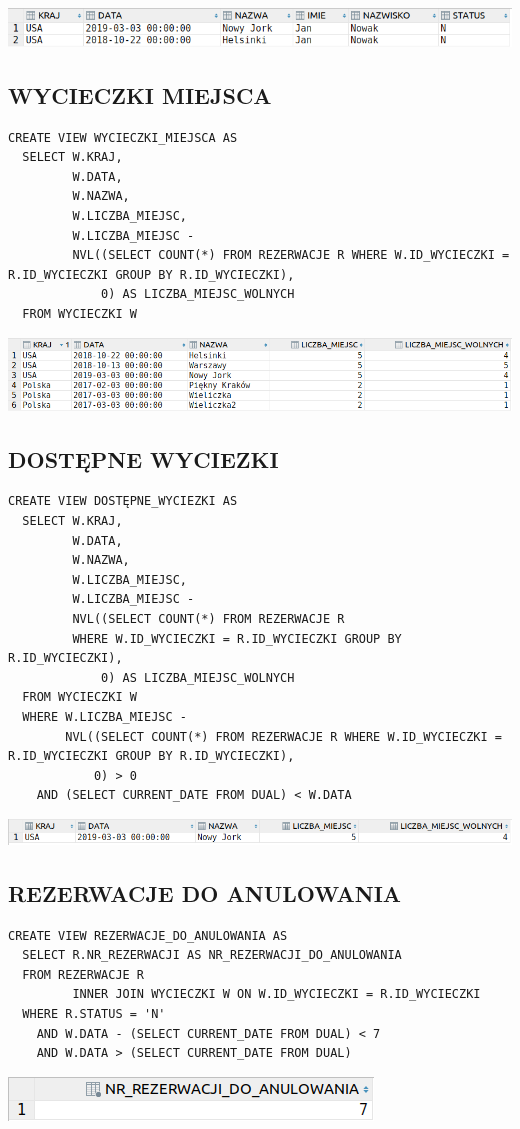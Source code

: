 \includegraphics[width=\linewidth]{./images/wycieczki_przyszle.png}

\subsection{WYCIECZKI MIEJSCA}
\begin{verbatim}
CREATE VIEW WYCIECZKI_MIEJSCA AS
  SELECT W.KRAJ,
         W.DATA,
         W.NAZWA,
         W.LICZBA_MIEJSC,
         W.LICZBA_MIEJSC -
         NVL((SELECT COUNT(*) FROM REZERWACJE R WHERE W.ID_WYCIECZKI = R.ID_WYCIECZKI GROUP BY R.ID_WYCIECZKI),
             0) AS LICZBA_MIEJSC_WOLNYCH
  FROM WYCIECZKI W
\end{verbatim}

\includegraphics[width=\linewidth]{./images/wycieczki_miejsca.png}

\subsection{DOSTĘPNE WYCIEZKI}
\begin{verbatim}
CREATE VIEW DOSTĘPNE_WYCIEZKI AS
  SELECT W.KRAJ,
         W.DATA,
         W.NAZWA,
         W.LICZBA_MIEJSC,
         W.LICZBA_MIEJSC -
         NVL((SELECT COUNT(*) FROM REZERWACJE R 
         WHERE W.ID_WYCIECZKI = R.ID_WYCIECZKI GROUP BY R.ID_WYCIECZKI),
             0) AS LICZBA_MIEJSC_WOLNYCH
  FROM WYCIECZKI W
  WHERE W.LICZBA_MIEJSC -
        NVL((SELECT COUNT(*) FROM REZERWACJE R WHERE W.ID_WYCIECZKI = R.ID_WYCIECZKI GROUP BY R.ID_WYCIECZKI),
            0) > 0
    AND (SELECT CURRENT_DATE FROM DUAL) < W.DATA
\end{verbatim}

\includegraphics[width=\linewidth]{./images/dostepne_wycieczki.png}

\subsection{REZERWACJE DO ANULOWANIA}
\begin{verbatim}
CREATE VIEW REZERWACJE_DO_ANULOWANIA AS
  SELECT R.NR_REZERWACJI AS NR_REZERWACJI_DO_ANULOWANIA
  FROM REZERWACJE R
         INNER JOIN WYCIECZKI W ON W.ID_WYCIECZKI = R.ID_WYCIECZKI
  WHERE R.STATUS = 'N'
    AND W.DATA - (SELECT CURRENT_DATE FROM DUAL) < 7
    AND W.DATA > (SELECT CURRENT_DATE FROM DUAL)
\end{verbatim}

\begin{minipage}{0.40\textwidth}
\includegraphics[width=\linewidth]{./images/rezerwacje_do_anulowania.png}
\end{minipage}
